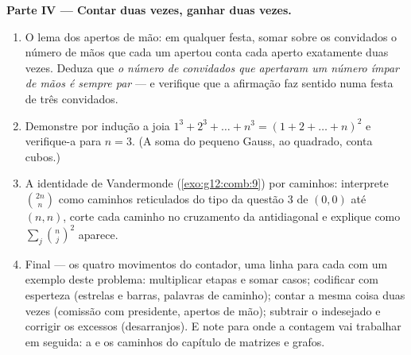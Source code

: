 \begin{problem}
\medskip
\noindent\textbf{Parte IV --- Contar duas vezes, ganhar duas
vezes.}
\begin{enumerate}[resume]
  \item O lema dos apertos de mão: em qualquer festa, somar sobre
        os convidados o número de mãos que cada um apertou conta
        cada aperto exatamente duas vezes. Deduza que \emph{o
        número de convidados que apertaram um número ímpar de
        mãos é sempre par} --- e verifique que a afirmação faz
        sentido numa festa de três convidados.
  \item Demonstre por indução a joia
        $1^3 + 2^3 + \dots + n^3 = (1 + 2 + \dots + n)^2$ e
        verifique-a para $n = 3$. (A soma do pequeno Gauss, ao
        quadrado, conta cubos.)
  \item A identidade de Vandermonde (\cref{exo:g12:comb:9}) por
        caminhos: interprete $\binom{2n}{n}$ como caminhos
        reticulados do tipo da questão 3 de $(0,0)$ até $(n,n)$,
        corte cada caminho no cruzamento da antidiagonal e
        explique como $\sum_j \binom nj^2$ aparece.
  \item Final --- os quatro movimentos do contador, uma linha
        para cada com um exemplo deste problema: multiplicar
        etapas e somar casos; codificar com esperteza (estrelas e
        barras, palavras de caminho); contar a mesma coisa duas
        vezes (comissão com presidente, apertos de mão);
        subtrair o indesejado e corrigir os excessos
        (desarranjos). E note para onde a contagem vai trabalhar
        em seguida: a  e os caminhos do capítulo de
        matrizes e grafos.
\end{enumerate}
\end{problem}
